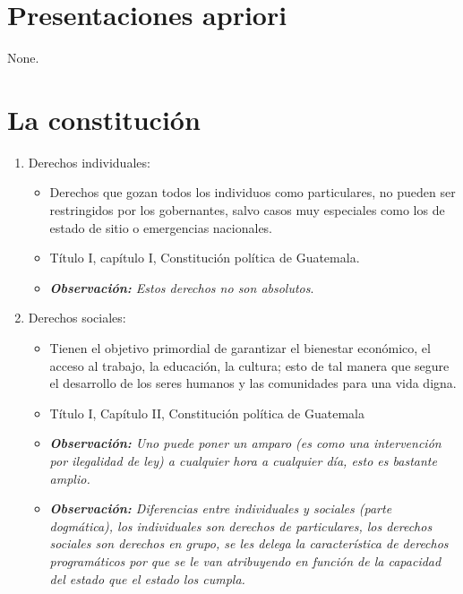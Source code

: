 \section{Presentaciones apriori}
None.

\section{La constitución}
\begin{enumerate}
    \item Derechos individuales:  
        \begin{itemize}
            \item Derechos que gozan todos los individuos como particulares, no pueden ser restringidos por los gobernantes, salvo casos muy especiales como los de estado de sitio o emergencias nacionales.
            \item Título I, capítulo I, Constitución política de Guatemala.
            \item \emph{\textbf{Observación: }Estos derechos no son absolutos}.
        \end{itemize}
    
    \item Derechos sociales: 
        \begin{itemize}
            \item Tienen el objetivo primordial de garantizar el bienestar económico, el acceso al trabajo, la educación, la cultura; esto de tal manera que segure el desarrollo de los seres humanos y las comunidades para una vida digna.
            \item Título I, Capítulo II, Constitución política de Guatemala
            \item \emph{\textbf{Observación: }Uno puede poner un amparo (es como una intervención por ilegalidad de ley) a cualquier hora a cualquier día, esto es bastante amplio.}
            \item \emph{\textbf{Observación: }Diferencias entre individuales y sociales (parte dogmática), los individuales son derechos de particulares, los derechos sociales son derechos en grupo, se les delega la característica de derechos programáticos por que se le van atribuyendo en función de la capacidad del estado que el estado los cumpla.} 
        \end{itemize}
    

\end{enumerate}
